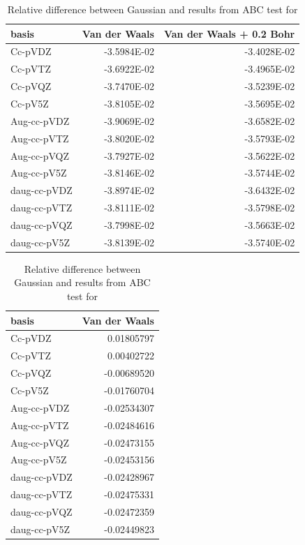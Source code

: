 \documentclass[../master_thesis.tex]{subfiles}
\begin{document}
\begin{table}[htbp]
\caption{Relative difference between Gaussian and \mrchem results from \ac{ABC}  test for }
\begin{tabular}{|l|r|r|}
\hline
basis & \multicolumn{1}{l|}{Van der Waals} & \multicolumn{1}{l|}{Van der Waals + 0.2 Bohr} \\ \hline
Cc-pVDZ & -3.5984E-02 & -3.4028E-02 \\ \hline
Cc-pVTZ & -3.6922E-02 & -3.4965E-02 \\ \hline
Cc-pVQZ & -3.7470E-02 & -3.5239E-02 \\ \hline
Cc-pV5Z & -3.8105E-02 & -3.5695E-02 \\ \hline
Aug-cc-pVDZ & -3.9069E-02 & -3.6582E-02 \\ \hline
Aug-cc-pVTZ & -3.8020E-02 & -3.5793E-02 \\ \hline
Aug-cc-pVQZ & -3.7927E-02 & -3.5622E-02 \\ \hline
Aug-cc-pV5Z & -3.8146E-02 & -3.5744E-02 \\ \hline
daug-cc-pVDZ & -3.8974E-02 & -3.6432E-02 \\ \hline
daug-cc-pVTZ & -3.8111E-02 & -3.5798E-02 \\ \hline
daug-cc-pVQZ & -3.7998E-02 & -3.5663E-02 \\ \hline
daug-cc-pV5Z & -3.8139E-02 & -3.5740E-02 \\ \hline
\end{tabular}
\label{tab:nopabcreldiff}
\end{table}

\begin{table}[htbp]
\caption{Relative difference between Gaussian and \mrchem results from \ac{ABC}  test for }
\begin{tabular}{|l|r|}
\hline
basis & \multicolumn{1}{l|}{Van der Waals} \\ \hline
Cc-pVDZ & 0.01805797 \\ \hline
Cc-pVTZ & 0.00402722 \\ \hline
Cc-pVQZ & -0.00689520 \\ \hline
Cc-pV5Z & -0.01760704 \\ \hline
Aug-cc-pVDZ & -0.02534307 \\ \hline
Aug-cc-pVTZ & -0.02484616 \\ \hline
Aug-cc-pVQZ & -0.02473155 \\ \hline
Aug-cc-pV5Z & -0.02453156 \\ \hline
daug-cc-pVDZ & -0.02428967 \\ \hline
daug-cc-pVTZ & -0.02475331 \\ \hline
daug-cc-pVQZ & -0.02472359 \\ \hline
daug-cc-pV5Z & -0.02449823 \\ \hline
\end{tabular}
\label{tab:cyanabcreldiff}
\end{table}
\end{document}
